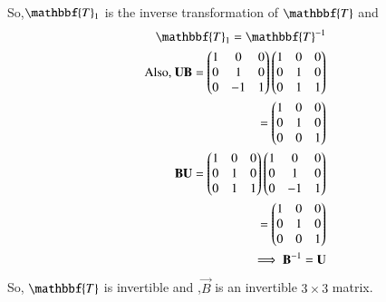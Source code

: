 \documentclass[journal,12pt,twocolumn]{IEEEtran}
\begin{document}
     So,$\mathbbf{T}_1$ is the inverse transformation of $\mathbbf{T}$ and
     \begin{align}
     \mathbbf{T}_1=\mathbbf{T}^{-1}\\
     \text{Also,  } \vec{U}\vec{B}=\myvec{1&0&0\\0&1&0\\0&-1&1}\myvec{1&0&0\\0&1&0\\0&1&1}\\
     =\myvec{1&0&0\\0&1&0\\0&0&1}\\
     \vec{B}\vec{U}=\myvec{1&0&0\\0&1&0\\0&1&1}\myvec{1&0&0\\0&1&0\\0&-1&1}\\=\myvec{1&0&0\\0&1&0\\0&0&1}\\
     \implies \vec{B}^{-1}=\vec{U}
\end{align}
So, $\mathbbf{T}$ is invertible and ,$\vec{B}$ is an invertible $3 \times 3$ matrix.
\end{document}
